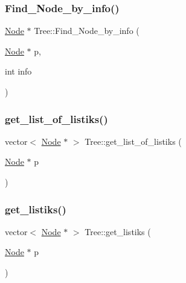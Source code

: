 \mbox{\label{class_tree_a16def61abcbc1dbb631a664e7bb02c98}} 
\subsubsection{\texorpdfstring{Find\+\_\+\+Node\+\_\+by\+\_\+info()}{Find\_Node\_by\_info()}}
{\footnotesize\ttfamily \mbox{\hyperlink{class_node}{Node}} $\ast$ Tree\+::\+Find\+\_\+\+Node\+\_\+by\+\_\+info (\begin{DoxyParamCaption}\item[{\mbox{\hyperlink{class_node}{Node}} $\ast$}]{p,  }\item[{int}]{info }\end{DoxyParamCaption})}

\mbox{\label{class_tree_a1feaf70139e6802c0b940c7c7fae9299}} 
\subsubsection{\texorpdfstring{get\+\_\+list\+\_\+of\+\_\+listiks()}{get\_list\_of\_listiks()}}
{\footnotesize\ttfamily vector$<$ \mbox{\hyperlink{class_node}{Node}} $\ast$ $>$ Tree\+::get\+\_\+list\+\_\+of\+\_\+listiks (\begin{DoxyParamCaption}\item[{\mbox{\hyperlink{class_node}{Node}} $\ast$}]{p }\end{DoxyParamCaption})}

\mbox{\label{class_tree_a8713847783793b6d5b0580b34d406f6d}} 
\subsubsection{\texorpdfstring{get\+\_\+listiks()}{get\_listiks()}}
{\footnotesize\ttfamily vector$<$ \mbox{\hyperlink{class_node}{Node}} $\ast$ $>$ Tree\+::get\+\_\+listiks (\begin{DoxyParamCaption}\item[{\mbox{\hyperlink{class_node}{Node}} $\ast$}]{p }\end{DoxyParamCaption})}

